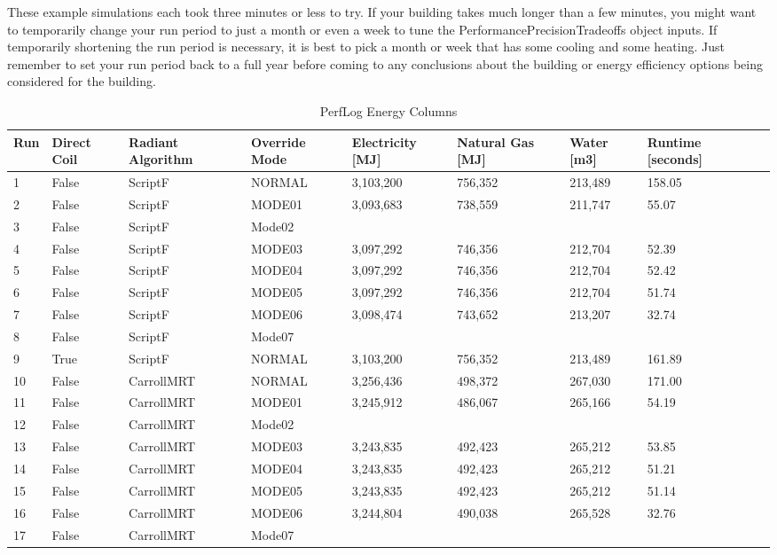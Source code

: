 These example simulations each took three minutes or less to try. If your building takes much longer than a few minutes, you might want to temporarily change your run period to just a  month or even a week to tune the PerformancePrecisionTradeoffs object inputs. If temporarily shortening the run period is necessary, it is best to pick a month or week that has some cooling and some heating. Just remember to set your run period back to a full year before coming to any conclusions about the building or energy efficiency options being considered for the building.


{\scriptsize
\begin{longtable}[c]{p{0.2in}p{0.4in}p{0.6in}p{0.7in}p{0.5in}p{0.5in}p{0.7in}p{0.7in}p{0.65in}}
\caption{PerfLog Energy Columns\label{table:perflog_mode_columns}} \tabularnewline
\toprule
Run & 
Direct Coil & 
Radiant Algorithm & 
Override Mode & 
  Electricity {[}MJ{]} &
  Natural Gas {[}MJ{]} &
  Water {[}m3{]} &
  Runtime {[}seconds{]} \tabularnewline
\midrule
\endfirsthead

1  & False & ScriptF  & NORMAL & 3,103,200 & 756,352 & 213,489 & 158.05 \tabularnewline
2  & False & ScriptF  & MODE01 & 3,093,683 & 738,559 & 211,747 & 55.07  \tabularnewline
3  & False & ScriptF  & Mode02 &           &         &         &        \tabularnewline
4  & False & ScriptF  & MODE03 & 3,097,292 & 746,356 & 212,704 & 52.39  \tabularnewline
5  & False & ScriptF  & MODE04 & 3,097,292 & 746,356 & 212,704 & 52.42  \tabularnewline
6  & False & ScriptF  & MODE05 & 3,097,292 & 746,356 & 212,704 & 51.74  \tabularnewline
7  & False & ScriptF  & MODE06 & 3,098,474 & 743,652 & 213,207 & 32.74  \tabularnewline
8  & False & ScriptF  & Mode07 &           &         &         &        \tabularnewline
9  & True  & ScriptF  & NORMAL & 3,103,200 & 756,352 & 213,489 & 161.89 \tabularnewline
10 & False & CarrollMRT & NORMAL & 3,256,436 & 498,372 & 267,030 & 171.00 \tabularnewline
11 & False & CarrollMRT & MODE01 & 3,245,912 & 486,067 & 265,166 & 54.19  \tabularnewline
12 & False & CarrollMRT & Mode02 &           &         &         &        \tabularnewline
13 & False & CarrollMRT & MODE03 & 3,243,835 & 492,423 & 265,212 & 53.85  \tabularnewline
14 & False & CarrollMRT & MODE04 & 3,243,835 & 492,423 & 265,212 & 51.21  \tabularnewline
15 & False & CarrollMRT & MODE05 & 3,243,835 & 492,423 & 265,212 & 51.14  \tabularnewline
16 & False & CarrollMRT & MODE06 & 3,244,804 & 490,038 & 265,528 & 32.76  \tabularnewline
17 & False & CarrollMRT & Mode07 &           &         &         &        \tabularnewline
\bottomrule
\end{longtable}
}


